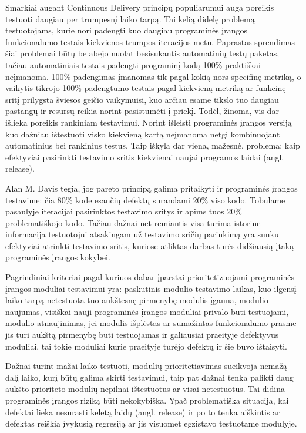 \documentclass{VUMIFPSbakalaurinis}
\begin{document}
\tableofcontents

Smarkiai augant Continuous Delivery principų populiarumui auga poreikis testuoti daugiau per trumpesnį laiko tarpą. Tai kelią didelę problemą testuotojams, kurie nori padengti kuo daugiau programinės įrangos funkcionalumo testais kiekvienos trumpos iteracijos metu. Paprastas sprendimas šiai problemai būtų be abejo nuolat besisukantis automatinių testų paketas, tačiau automatiniais testais padengti programinį kodą 100\% praktiškai neįmanoma. 100\% padengimas įmanomas tik pagal kokią nors specifinę metriką, o vaikytis tikrojo 100\% padengtumo testais pagal kiekvieną metriką ar funkcinę sritį prilygsta šviesos geičio vaikymuisi, kuo arčiau esame tikslo tuo daugiau pastangų ir resursų reikia norint pasistūmėti į priekį. Todėl, žinoma, vis dar išlieka poreikis rankiniam testavimui. Norint išleisti programinės įrangos versiją kuo dažniau ištestuoti visko kiekvieną kartą neįmanoma netgi kombinuojant automatinius bei rankinius testus. Taip iškyla dar viena, mažesnė, problema: kaip efektyviai pasirinkti testavimo sritis kiekvienai naujai programos laidai (angl. release). 

Alan M. Davis \cite{Davis:1995:PSD:203406} tegia, jog pareto principą galima pritaikyti ir programinės įrangos testavime: čia 80\% kode esančių defektų surandami 20\% viso kodo. Tobulame pasaulyje iteracijai pasirinktos testavimo sritys ir apims tuos 20\% problematiškojo kodo. Tačiau dažnai net remiantis visa turima istorine informacija testuotojui atsakingam už testavimo sričių parinkimą yra sunku efektyviai atrinkti testavimo sritis, kuriose atliktas darbas turės didžiausią įtaką programinės įrangos kokybei.

Pagrindiniai kriteriai pagal kuriuos dabar įparstai prioritetizuojami programinės įrangos moduliai testavimui yra: paskutinis modulio testavimo laikas, kuo ilgensį laiko tarpą netestuota tuo aukštesnę pirmenybę modulis įgauna, modulio naujumas, visiškai nauji programinės įrangos moduliai privalo būti testuojami, modulio atnaujinimas, jei modulis išplėstas ar sumažintas funkcionalumo prasme jis turi aukštą pirmenybę būti testuojamas ir galiausiai praeityje defektyvūs moduliai, tai tokie moduliai kurie praeityje turėjo defektų ir šie buvo ištaisyti.

Dažnai turint mažai laiko testuoti, modulių prioritetiavimas sueikvoja nemažą dalį laiko, kurį būtų galima skirti testavimui, taip pat dažnai tenka palikti daug aukšto prioriteto modulių nepilnai ištestuotus ar visai netestuotus. Tai didina programinės įrangos riziką būti nekokybiška. Ypač problematiška situacija, kai defektai lieka nesurasti keletą laidų (angl. release) ir po to tenka aiškintis ar defektas reiškia įvykusią regresiją ar jis visuomet egzistavo testuotame modulyje.
\end{document}
